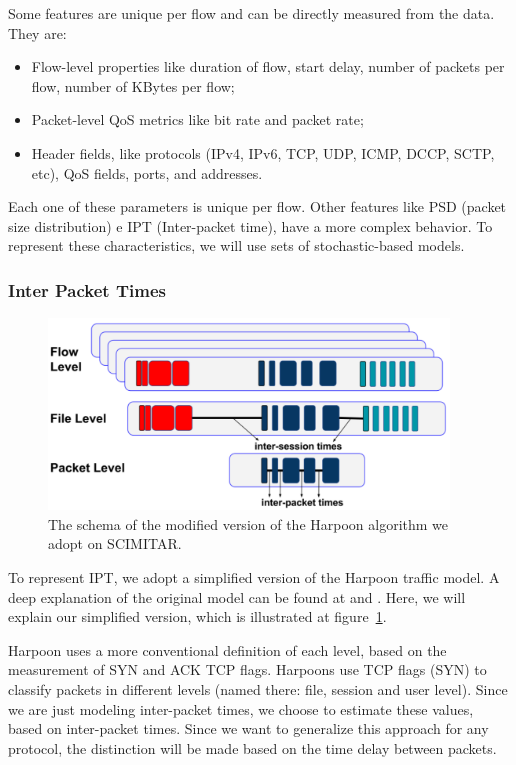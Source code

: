 Some features are unique per flow and can be directly measured from the data. They are:  

\begin{itemize}
\item Flow-level properties like duration of flow, start delay, number of packets per flow, number of KBytes per flow;
\item Packet-level QoS metrics like bit rate and packet rate; 
\item Header fields, like protocols (IPv4, IPv6, TCP, UDP, ICMP, DCCP, SCTP, etc), QoS fields, ports, and addresses.
\end{itemize}

Each one of these parameters is unique per flow. Other features like PSD (packet size distribution) e IPT (Inter-packet time), have a more complex behavior.  To represent these characteristics, we will use sets of stochastic-based models.  

\subsubsection{Inter Packet Times}

\begin{figure}[ht!]
    \centering
    \includegraphics[height=2.0in]{figures/ch3/modified-harpoon-model}
    \caption{The schema of the modified version of the Harpoon algorithm we adopt on SCIMITAR.}
    \label{fig:modified-harpoon-model}
\end{figure}

To represent IPT, we adopt a simplified version of the Harpoon traffic model. A deep explanation of the original model can be found at \cite{harpoon-paper} and \cite{harpoon-validation}. Here, we will explain our simplified version, which is illustrated at figure~\ref{fig:modified-harpoon-model}. 

Harpoon uses a more conventional definition of each level, based on the measurement of SYN and ACK TCP flags. Harpoons use TCP flags (SYN) to classify packets in different levels (named there: file, session and user level). Since we are just modeling inter-packet times, we choose to estimate these values, based on inter-packet times. Since we want to generalize this approach for any protocol, the distinction will be made based on the time delay between packets.

